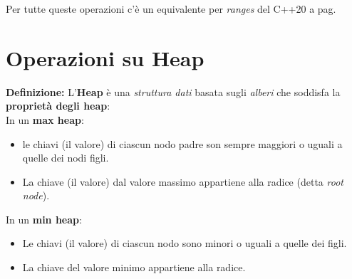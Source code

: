 \fleuron

\textsf{\small Per tutte queste operazioni c'è un equivalente per \emph{ranges} del C++20 a pag. \pageref{ranges}} \\


\newpage

\section{Operazioni su Heap}

\textsf{\small \textbf{Definizione: } L'\textbf{Heap} è una \emph{struttura dati} basata sugli \emph{alberi} che soddisfa la \textbf{proprietà degli heap}: } \\

\textsf{\small In un \textbf{max heap}: } \\

\begin{itemize}
	\item \textsf{\small le chiavi (il valore) di ciascun nodo padre son sempre maggiori o uguali a quelle dei nodi figli.}
	\item \textsf{\small La chiave (il valore) dal valore massimo appartiene alla radice (detta \emph{root node}).}
\end{itemize}

\textsf{\small In un \textbf{min heap}: } \\

\begin{itemize}
	\item \textsf{\small Le chiavi (il valore) di ciascun nodo sono minori o uguali a quelle dei figli.}
	\item \textsf{\small La chiave del valore minimo appartiene alla radice. }
\end{itemize}

